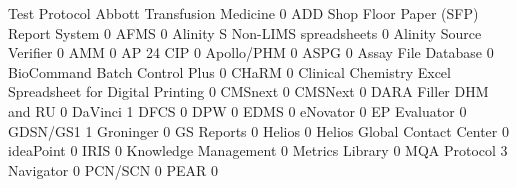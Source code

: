 \documentclass{article}
\begin{document}
\begin{Schunk}
\begin{Soutput}
                                                            Test Protocol
  Abbott Transfusion Medicine                                           0
  ADD Shop Floor Paper (SFP) Report System                              0
  AFMS                                                                  0
  Alinity S Non-LIMS spreadsheets                                       0
  Alinity Source Verifier                                               0
  AMM                                                                   0
  AP 24 CIP                                                             0
  Apollo/PHM                                                            0
  ASPG                                                                  0
  Assay File Database                                                   0
  BioCommand Batch Control Plus                                         0
  CHaRM                                                                 0
  Clinical Chemistry Excel Spreadsheet for Digital Printing             0
  CMSnext                                                               0
  CMSNext                                                               0
  DARA Filler DHM and RU                                                0
  DaVinci                                                               1
  DFCS                                                                  0
  DPW                                                                   0
  EDMS                                                                  0
  eNovator                                                              0
  EP Evaluator                                                          0
  GDSN/GS1                                                              1
  Groninger                                                             0
  GS Reports                                                            0
  Helios                                                                0
  Helios Global Contact Center                                          0
  ideaPoint                                                             0
  IRIS                                                                  0
  Knowledge Management                                                  0
  Metrics Library                                                       0
  MQA Protocol                                                          3
  Navigator                                                             0
  PCN/SCN                                                               0
  PEAR                                                                  0

\end{Soutput}
\end{Schunk}
\end{document}
